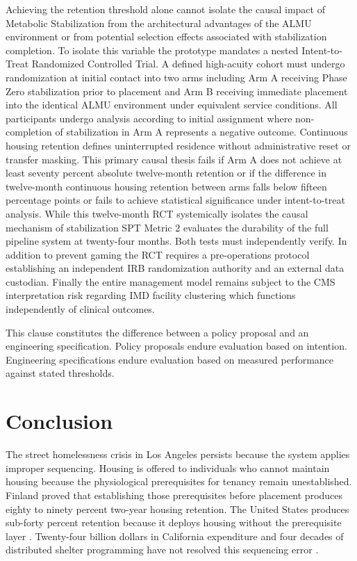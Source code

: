 \documentclass[12pt, letterpaper]{article}
\begin{document}
Achieving the retention threshold alone cannot isolate the causal impact of Metabolic Stabilization from the architectural advantages of the ALMU environment or from potential selection effects associated with stabilization completion. To isolate this variable the prototype mandates a nested Intent-to-Treat Randomized Controlled Trial. A defined high-acuity cohort must undergo randomization at initial contact into two arms including Arm A receiving Phase Zero stabilization prior to placement and Arm B receiving immediate placement into the identical ALMU environment under equivalent service conditions. All participants undergo analysis according to initial assignment where non-completion of stabilization in Arm A represents a negative outcome. Continuous housing retention defines uninterrupted residence without administrative reset or transfer masking. This primary causal thesis fails if Arm A does not achieve at least seventy percent absolute twelve-month retention or if the difference in twelve-month continuous housing retention between arms falls below fifteen percentage points or fails to achieve statistical significance under intent-to-treat analysis. While this twelve-month RCT systemically isolates the causal mechanism of stabilization SPT Metric 2 evaluates the durability of the full pipeline system at twenty-four months. Both tests must independently verify. In addition to prevent gaming the RCT requires a pre-operations protocol establishing an independent IRB randomization authority and an external data custodian. Finally the entire management model remains subject to the CMS interpretation risk regarding IMD facility clustering which functions independently of clinical outcomes.

This clause constitutes the difference between a policy proposal and an engineering specification. Policy proposals endure evaluation based on intention. Engineering specifications endure evaluation based on measured performance against stated thresholds.

\clearpage
{}
\section{Conclusion}

The street homelessness crisis in Los Angeles persists because the system applies improper sequencing. Housing is offered to individuals who cannot maintain housing because the physiological prerequisites for tenancy remain unestablished. Finland proved that establishing those prerequisites before placement produces eighty to ninety percent two-year housing retention. The United States produces sub-forty percent retention because it deploys housing without the prerequisite layer \citep{ucsf_bhhi_2023}. Twenty-four billion dollars in California expenditure and four decades of distributed shelter programming have not resolved this sequencing error \citep{ca_24b_expenditure_2024, finland_housing_first_2023, feantsa_finland_2022}.
\end{document}
